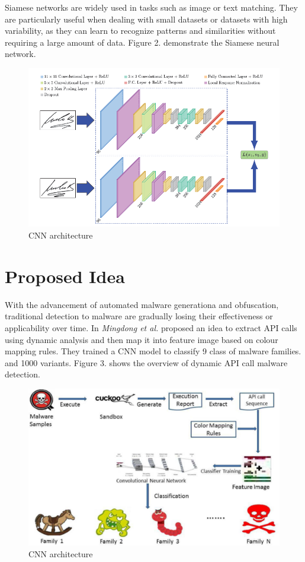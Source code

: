 \documentclass{article}
\begin{document}
Siamese networks are widely used in tasks such as image or text matching.
They are particularly useful when dealing with small datasets or datasets with high variability, 
as they can learn to recognize patterns and similarities without requiring a large amount of data.
Figure 2. demonstrate the Siamese neural network.
\begin{figure}
    \includegraphics[width=\textwidth]{fig/SiameseNN.png}    
    \caption{CNN architecture}
\end{figure}
\section{Proposed Idea}
With the advancement of automated malware generationa and obfuscation, 
traditional detection to malware are gradually losing their effectiveness or applicability over time.
In \cite{ref1} \textit{Mingdong et al.} proposed an idea to extract API calls using dynamic analysis and then 
map it into feature image based on colour mapping rules. They trained a CNN model to classify 9 class of malware families.
and 1000 variants. Figure 3. shows the overview of dynamic API call malware detection.
\begin{figure}
    \includegraphics[width=\textwidth]{fig/overview.png}    
    \caption{CNN architecture}
\end{figure}
\end{document}
